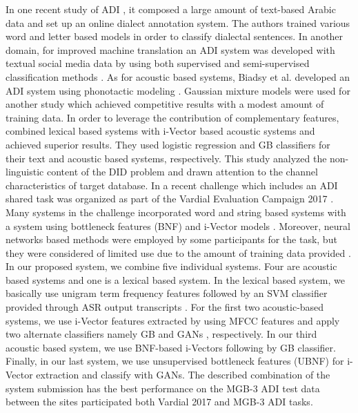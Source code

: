 \documentclass{article}
\begin{document}
In one recent study of ADI \cite{Zaidan2014ADI}, it composed a large amount of text-based Arabic data and set up an online dialect annotation system. The authors trained various word and letter based models in order to classify dialectal sentences. In another domain, for improved machine translation an ADI system was developed with textual social media data by using both supervised and semi-supervised classification methods \cite{huang2015improved}. As for acoustic based systems, Biadsy et al. developed an ADI system using phonotactic modeling \cite{Biadsy2009SAD}. Gaussian mixture models were used for another study \cite{lei2011adiGMM} which achieved competitive results with a modest amount of training data. In order to leverage the contribution of complementary features, \cite{hansen2016unsupervised} combined lexical based systems with i-Vector based acoustic systems and achieved superior results. They used logistic regression and GB classifiers for their text and acoustic based systems, respectively. This study \cite{Boril2012} analyzed the non-linguistic content of the DID problem and drawn attention to the channel characteristics of target database. In a recent challenge which includes an ADI shared task was organized as part of the Vardial Evaluation Campaign 2017 \cite{zampieri2017vardial17}. Many systems in the challenge incorporated word and string based systems with a system using bottleneck features (BNF) and i-Vector models \cite{AliDCKYG0R16}. Moreover, neural networks based methods were employed by some participants \cite{belinkov2016character,guggilla2016discrimination} for the task, but they were considered of limited use due to the amount of training data provided \cite{malmasi2016discriminating}. In our proposed system, we combine five individual systems. Four are acoustic based systems and one is a lexical based system. In the lexical based system, we basically use unigram term frequency features followed by an SVM classifier \cite{yu2013libshorttext} provided through ASR output transcripts \cite{AliDCKYG0R16}. For the first two acoustic-based systems, we use i-Vector features extracted by using MFCC features and apply two alternate classifiers namely GB \cite{gang_ICASSP13_backend} and GANs \cite{salimans2016improved}, respectively. In our third acoustic based system, we use BNF-based i-Vectors \cite{AliDCKYG0R16} following by GB classifier. Finally, in our last system, we use unsupervised bottleneck features (UBNF) \cite{zhang2017ubnf} for i-Vector extraction and classify with GANs. The described combination of the system submission has the best performance on the MGB-3 ADI test data between the sites participated both Vardial 2017 \cite{zampieri2017vardial17} and MGB-3 ADI \cite{Ali2017mgb3} tasks.
\end{document}

